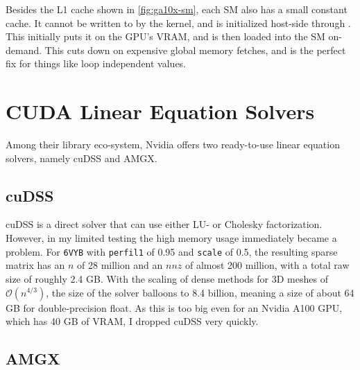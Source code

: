 Besides the L1 cache shown in \ref{fig:ga10x-sm}, each SM also has a small constant cache.
It cannot be written to by the kernel, and is initialized host-side through .
This initially puts it on the GPU's VRAM, and is then loaded into the SM on-demand.
This cuts down on expensive global memory fetches, and is the perfect fix for things like loop independent values.

\section{CUDA Linear Equation Solvers}
\label{sec:optimization-techniques-cu-lin-eq-solvers}

Among their library eco-system, Nvidia offers two ready-to-use linear equation solvers, namely cuDSS and AMGX.

\subsection{cuDSS}
\label{sec:optimization-techniques-cu-lin-eq-solvers-cuDSS}

cuDSS is a direct solver that can use either LU- or Cholesky factorization.
However, in my limited testing the high memory usage immediately became a problem.
For \texttt{6VYB} with \texttt{perfil1} of 0.95 and \texttt{scale} of 0.5, the resulting sparse matrix has an $n$ of 28 million and an $nnz$ of almost 200 million, with a total raw size of roughly 2.4 GB.
With the scaling of dense methods for 3D meshes of \(\mathcal{O}(n^{4/3})\), the size of the solver balloons to 8.4 billion, meaning a size of about 64 GB for double-precision float.
As this is too big even for an Nvidia A100 GPU, which has 40 GB of VRAM, I dropped cuDSS very quickly.

\subsection{AMGX}
\label{sec:optimization-techniques-cu-lin-eq-solvers-amgx}


